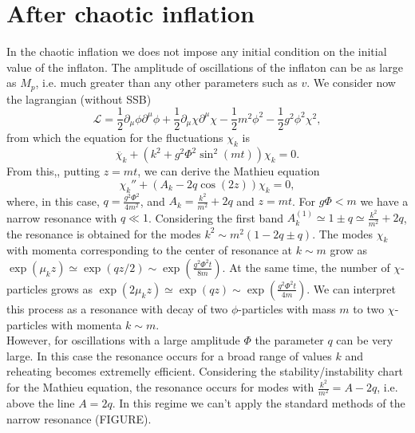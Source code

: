 \documentclass[11pt,a4paper,twoside]{book}
\begin{document}
 \section{After chaotic inflation}
 In the chaotic inflation we does not impose any initial condition on the initial value of the inflaton. The amplitude  of oscillations of the inflaton can be as large as $ M_{p} $, i.e. much greater than any other parameters such as $ v $. We consider now the lagrangian (without SSB)
 \begin{equation}
 	\label{Chap4:potentialChaoticInflation}
 	\mathcal{L}=\frac{1}{2}\partial_{\mu}\phi\partial^{\mu}\phi + \frac{1}{2}\partial_{\mu}\chi\partial^{\mu}\chi - \frac{1}{2}m^{2}\phi^{2} - \frac{1}{2}g^{2}\phi^{2}\chi^{2},
 \end{equation}
from which the equation for the fluctuations $ \chi_{k} $ is
 \begin{equation}
 	\label{Chap4:eqFluctuationChaoticModel}
 	\ddot{\chi_{k}} + (k^{2} + g^{2}\Phi^{2}\sin^{2}(mt))\chi_{k}=0.
 \end{equation}
From this,, putting $ z=mt $, we can derive the Mathieu equation 
\begin{equation}
	\label{Chap4:eqMotionChi}
	\chi_{k}'' + (A_{k} - 2q\cos(2z))\chi_{k}=0,
\end{equation}
where, in this case, $ q=\frac{g^{2}\Phi^{2}}{4m^{2}} $, and $ A_{k} = \frac{k^{2}}{m^{2}} + 2q  $ and $ z=mt $. For $ g\Phi < m $ we have a narrow resonance with $ q \ll 1 $. Considering the first band $ A_{k}^{(1)}\simeq 1\pm q \simeq \frac{k^{2}}{m^{2}} + 2q $, the resonance is obtained for the modes $ k^{2}\sim m^{2}(1-2q \pm q) $. The modes $\chi_{k}$ with momenta corresponding  to the center of resonance at $ k \sim m $ grow as $\exp(\mu_{k}z)\simeq \exp(qz/2)\sim \exp(\frac{g^{2}\Phi^{2}t}{8m})$. At the same time, the number of $\chi$-particles grows as $\exp(2\mu_{k}z) \simeq\exp(qz) \sim \exp(\frac{g^{2}\Phi^{2}t}{4m})$. We can interpret this process as a resonance with decay of two $ \phi $-particles with mass $ m $ to two $\chi$-particles with momenta $ k\sim m $.\\
However, for oscillations with a large amplitude $\Phi$ the parameter $ q $ can be very large. In this case the resonance occurs for a broad range of values $ k $ and reheating becomes extremelly efficient. Considering the stability/instability chart for the Mathieu equation, the resonance occurs for modes  with $ \frac{k^{2}}{m^{2}}=A-2q $, i.e. above the line $ A=2q $. In this regime we can't apply the standard methods of the narrow resonance (FIGURE).\\
\end{document}
